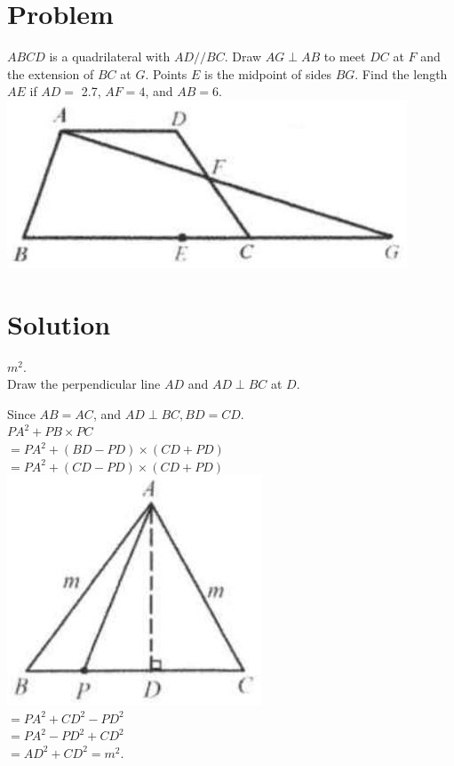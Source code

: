 \documentclass{article}
\begin{document}
\section*{Problem}
\(A B C D\) is a quadrilateral with \(A D / / B C\). Draw \(A G \perp A B\) to meet \(D C\) at \(F\) and the extension of \(B C\) at \(G\). Points \(E\) is the midpoint of sides \(B G\). Find the length \(A E\) if \(A D=\) 2.7, \(A F=4\), and \(A B=6\).\\
\centering
\includegraphics[width=\textwidth]{images/016(1).jpg}

\section*{Solution}
\(m^{2}\).\\
Draw the perpendicular line \(A D\) and \(A D \perp B C\) at \(D\).

Since \(A B=A C\), and \(A D \perp B C, B D=C D\).\\
\(P A^{2}+P B \times P C\)\\
\(=P A^{2}+(B D-P D) \times(C D+P D)\)\\
\(=P A^{2}+(C D-P D) \times(C D+P D)\)\\
\centering
\includegraphics[width=\textwidth]{images/094.jpg}\\
\(=P A^{2}+C D^{2}-P D^{2}\)\\
\(=P A^{2}-P D^{2}+C D^{2}\)\\
\(=A D^{2}+C D^{2}=m^{2}\).
\end{document}

